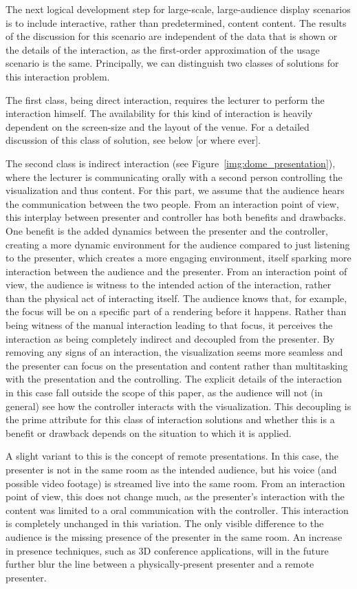 \documentclass[review,journal]{vgtc}         %
\begin{document}
The next logical development step for large-scale, large-audience display scenarios is to include interactive, rather than predetermined, content content.
The results of the discussion for this scenario are independent of the data that is shown or the details of the interaction, as the first-order approximation of the usage scenario is the same.
Principally, we can distinguish two classes of solutions for this interaction problem.

The first class, being direct interaction, requires the lecturer to perform the interaction himself.
The availability for this kind of interaction is heavily dependent on the screen-size and the layout of the venue.
For a detailed discussion of this class of solution, see below [or where ever].

The second class is indirect interaction (see Figure~\ref{img:dome_presentation}), where the lecturer is communicating orally with a second person controlling the visualization and thus content.
For this part, we assume that the audience hears the communication between the two people.
From an interaction point of view, this interplay between presenter and controller has both benefits and drawbacks.
One benefit is the added dynamics between the presenter and the controller, creating a more dynamic environment for the audience compared to just listening to the presenter, which creates a more engaging environment, itself sparking more interaction between the audience and the presenter.
From an interaction point of view, the audience is witness to the intended action of the interaction, rather than the physical act of interacting itself.
The audience knows that, for example, the focus will be on a specific part of a rendering before it happens.
Rather than being witness of the manual interaction leading to that focus, it perceives the interaction as being completely indirect and decoupled from the presenter.
By removing any signs of an interaction, the visualization seems more seamless and the presenter can focus on the presentation and content rather than multitasking with the presentation and the controlling.
The explicit details of the interaction in this case fall outside the scope of this paper, as the audience will not (in general) see how the controller interacts with the visualization.
This decoupling is the prime attribute for this class of interaction solutions and whether this is a benefit or drawback depends on the situation to which it is applied.

A slight variant to this is the concept of remote presentations.
In this case, the presenter is not in the same room as the intended audience, but his voice (and possible video footage) is streamed live into the same room.
From an interaction point of view, this does not change much, as the presenter's interaction with the content was limited to a oral communication with the controller.
This interaction is completely unchanged in this variation.
The only visible difference to the audience is the missing presence of the presenter in the same room.
An increase in presence techniques, such as 3D conference applications, will in the future further blur the line between a physically-present presenter and a remote presenter.
\end{document}
